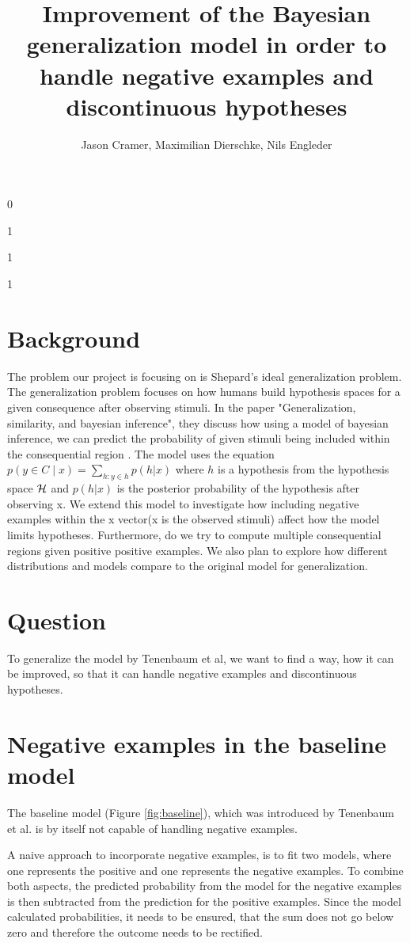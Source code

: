 \documentclass[12pt, ]{scrartcl}
\title{Improvement of the Bayesian generalization model in order to handle negative examples and discontinuous hypotheses}
\begin{document}
\def\isblind{1}
\def\doublecol{1}
\def\doublespace{0}
\if\isblind0
    \author{Jason Cramer, Maximilian Dierschke, Nils Engleder}\fi
\if \isblind1
    \author{}\fi

\maketitle
\if \doublespace1
	\doublespacing \fi
	
\if \doublecol1
\begin{multicols}{2}
	\fi
\section{Background}
The problem our project is focusing on is Shepard's ideal generalization problem. The generalization problem focuses on how humans build hypothesis spaces for a given consequence after observing stimuli.
In the paper "Generalization, similarity, and bayesian inference", they discuss how using a model of bayesian inference, we can predict the probability of given stimuli being included within the consequential region \cite{Tenenbaum}.
The model uses the equation $p(y \in C \mid x) = \sum\limits_{h:y\in h} p(h | x)$ where $h$ is a hypothesis from the hypothesis space ${\cal H}$ and $p(h | x)$ is the posterior probability of  the hypothesis after observing x.
We extend this model to investigate how including negative examples within the x vector(x is the observed stimuli) affect how the model limits hypotheses. Furthermore, do we try to compute multiple consequential regions given positive positive examples. We also plan to explore how different distributions and models compare to the original model for generalization.
\section{Question}
To generalize the model by Tenenbaum et al, we want to find a way, how it can be improved, so that it can handle negative examples and discontinuous hypotheses.

\section{Negative examples in the baseline model}
The baseline model (Figure \ref{fig:baseline}), which was introduced by Tenenbaum et al. is by itself not capable of handling negative examples. 

A naive approach to incorporate negative examples, is to fit two models, where one represents the positive and one represents the negative examples. To combine both aspects, the predicted probability from the model for the negative examples is then subtracted from the prediction for the positive examples. 
Since the model calculated probabilities, it needs to be ensured, that the sum does not go below zero and therefore the outcome needs to be rectified.


\end{multicols}
\end{document}
